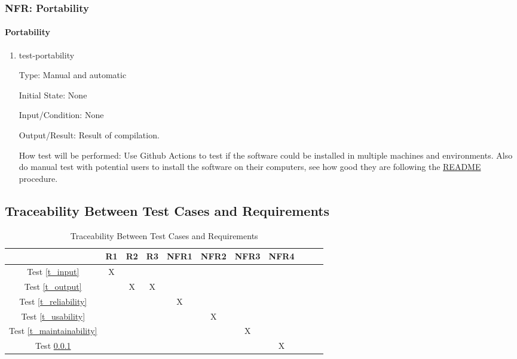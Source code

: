 \documentclass[12pt, titlepage]{article}
\begin{document}
		
\subsubsection{NFR: Portability}\label{t_portability}
		
\paragraph{Portability}

\begin{enumerate}

\item{test-portability}

Type: Manual and automatic
					
Initial State: None
					
Input/Condition: None
					
Output/Result: Result of compilation.
					
How test will be performed: Use Github Actions to test if the software could be installed in multiple machines and environments. Also do manual test with potential users to install the software on their computers, see how good they are following the \href{https://github.com/CynthiaLiu0805/BridgeCorrosion/blob/main/README.md}{README} procedure.

\end{enumerate}
		

\subsection{Traceability Between Test Cases and Requirements}

\begin{table}[h]
\centering
\begin{tabular}{|c|c|c|c|c|c|c|c|c|c|c|}
\hline
	& R1 & R2 & R3  & NFR1 & NFR2 & NFR3 & NFR4  \\
\hline
Test \ref{t_input}        & X & & & & & &  \\ \hline
Test \ref{t_output}        & & X & X & & & &  \\ \hline
Test \ref{t_reliability}        & & & & X & & &  \\ \hline
Test \ref{t_usability}        & & & & & X & &  \\ \hline
Test \ref{t_maintainability}        & & & & & & X &  \\ \hline
Test \ref{t_portability}        & & & & & & & X  \\ \hline

\end{tabular}
\caption{Traceability Between Test Cases and Requirements}
\label{Table:test_requirements}
\end{table}
\end{document}

